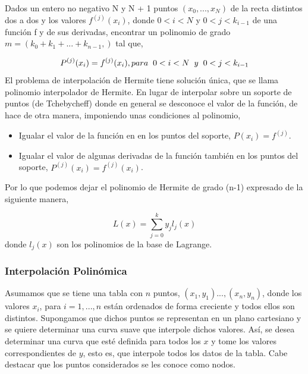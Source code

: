 \documentclass[
  12pt,
]{krantz}
\providecommand{\tightlist}{%
  \setlength{\itemsep}{0pt}\setlength{\parskip}{0pt}}
\begin{document}
Dados un entero no negativo N y N + 1 puntos \((x_{0},..., x_{N})\) de la recta distintos dos a dos y los valores \(f^{(j)} (x_{i})\), donde \(0<i<N\) y \(0<j<k_{i-1}\) de una función f y de sus derivadas, encontrar un polinomio de grado \(m = (k_{0} +k_{1} +...+k_{n-1},)\) tal que,

\[\displaystyle{P^{(j)} (x_{i}) = f^{(j)} (x_{i}), para \hspace{0.2cm} 0<i<N \hspace{0.2cm}y \hspace{0.2cm} 0<j<k_{i-1}}\]
El problema de interpolación de Hermite tiene solución única, que se llama polinomio interpolador de Hermite. En lugar de interpolar sobre un soporte de puntos (de Tchebycheff) donde en general se desconoce el valor de la función, de hace de otra manera, imponiendo unas condiciones al polinomio,

\begin{itemize}
\tightlist
\item
  Igualar el valor de la función en en los puntos del soporte, \(P (x_{i}) = f^{(j)}\).
\item
  Igualar el valor de algunas derivadas de la función también en los puntos del soporte, \(P^{(j)} (x_{i}) = f^{(j)} (x_{i})\).
\end{itemize}

Por lo que podemos dejar el polinomio de Hermite de grado (n-1) expresado de la siguiente manera,

\[\displaystyle{L(x) = \sum_{j=0}^{k} y_{j} l_{j} (x) }\]
donde \(l_{j}(x)\) son los polinomios de la base de Lagrange.

\hypertarget{interpolacion-polinomica}{%
\subsubsection{Interpolación Polinómica}\label{interpolacion-polinomica}}

Asumamos que se tiene una tabla con \(n\) puntos, \((x_{1},y_{1})...,(x_{n},y_{n})\), donde los valores \(x_{i}\), para \(i=1,...,n\) están ordenados de forma creciente y todos ellos son distintos. Supongamos que dichos puntos se representan en un plano cartesiano y se quiere determinar una curva suave que interpole dichos valores. Así, se desea determinar una curva que esté definida para todos los \(x\) y tome los valores correspondientes de \(y\), esto es, que interpole todos los datos de la tabla. Cabe destacar que los puntos considerados se les conoce como nodos.
\end{document}
